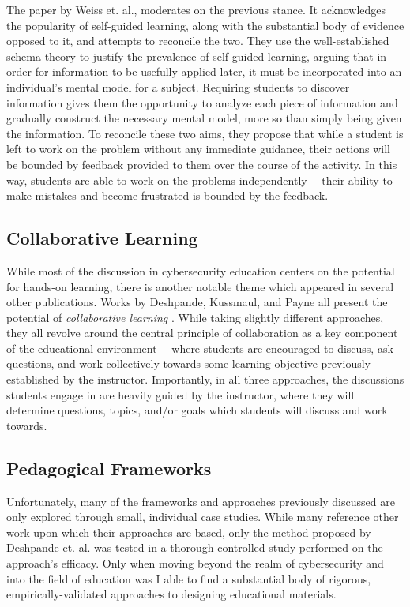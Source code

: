     The paper by Weiss et. al., moderates on the previous stance. %
It acknowledges the popularity of self-guided learning, along with the substantial body of evidence opposed to it, and attempts to reconcile the two. %
They use the well-established schema theory to justify the prevalence of self-guided learning, arguing that in order for information to be usefully applied later, it must be incorporated into an individual's mental model for a subject. %
Requiring students to discover information gives them the opportunity to analyze each piece of information and gradually construct the necessary mental model, more so than simply being given the information. %
To reconcile these two aims, they propose that while a student is left to work on the problem without any immediate guidance, their actions will be bounded by feedback provided to them over the course of the activity. %
In this way, students are able to work on the problems independently---%
their ability to make mistakes and become frustrated is bounded by the feedback. 

\subsection{Collaborative Learning}

    While most of the discussion in cybersecurity education centers on the potential for hands-on learning, there is another notable theme which appeared in several other publications. 
    Works by Deshpande, Kussmaul, and Payne all present the potential of \emph{collaborative learning} \cite{P-Deshpande,C-Kussmaul,B-Payne}. %
While taking slightly different approaches, they all revolve around the central principle of collaboration as a key component of the educational environment---%
where students are encouraged to discuss, ask questions, and work collectively towards some learning objective previously established by the instructor. %
Importantly, in all three approaches, the discussions students engage in are heavily guided by the instructor, where they will determine questions, topics, and/or goals which students will discuss and work towards. 


\subsection{Pedagogical Frameworks}

    Unfortunately, many of the frameworks and approaches previously discussed are only explored through small, individual case studies. %
While many reference other work upon which their approaches are based, only the method proposed by Deshpande et. al. was tested in a thorough controlled study performed on the approach's efficacy. %
Only when moving beyond the realm of cybersecurity and into the field of education was I able to find a substantial body of rigorous, empirically-validated approaches to designing educational materials. 

